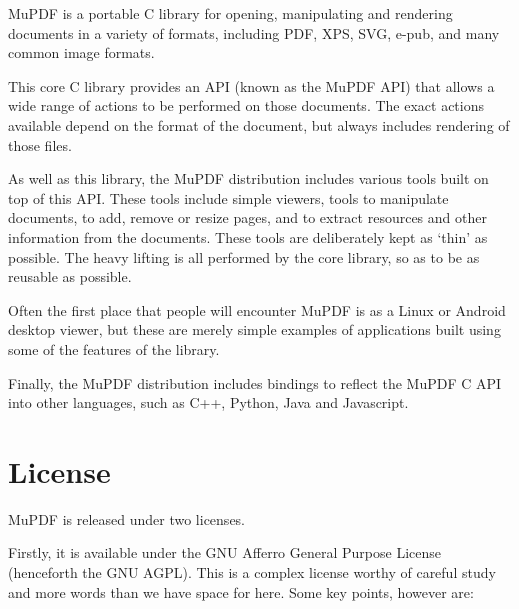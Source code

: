 \documentclass[oneside]{book}
\begin{document}
MuPDF is a portable C library for opening, manipulating and rendering documents in a variety of formats, including PDF, XPS, SVG, e-pub, and many common image formats.

This core C library provides an API (known as the MuPDF API) that allows a wide range of actions to be performed on those documents. The exact actions available depend on the format of the document, but always includes rendering of those files.

As well as this library, the MuPDF distribution includes various tools built on top of this API. These tools include simple viewers, tools to manipulate documents, to add, remove or resize pages, and to extract resources and other information from the documents. These tools are deliberately kept as `thin' as possible. The heavy lifting is all performed by the core library, so as to be as reusable as possible.

Often the first place that people will encounter MuPDF is as a Linux or Android desktop viewer, but these are merely simple examples of applications built using some of the features of the library.

Finally, the MuPDF distribution includes bindings to reflect the MuPDF C API into other languages, such as C++, Python, Java and Javascript.


\section{License}

MuPDF is released under two licenses.

Firstly, it is available under the GNU Afferro General Purpose License (henceforth the GNU AGPL). This is a complex license worthy of careful study and more words than we have space for here. Some key points, however are:
\end{document}
